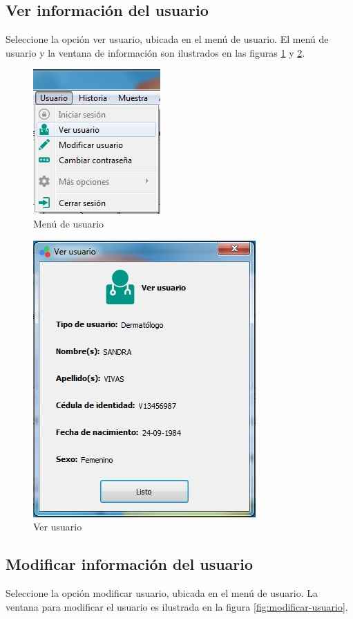 	\subsection*{Ver informaci\'{o}n del usuario}
	
	Seleccione la opci\'{o}n ver usuario, ubicada en el men\'{u} de usuario. El men\'{u} de usuario y la ventana de informaci\'{o}n son ilustrados en las figuras \ref{fig:menu-usuario} y \ref{fig:ver-usuario}.
\newpage
\null
\vfill
\begin{figure}[H]
  \centering
  \includegraphics[width=.3\linewidth]{./img/menu-usuario.jpg}
\caption[]{Men\'{u} de usuario\label{fig:menu-usuario}}
\end{figure}

\begin{figure}[H]
  \centering
  \includegraphics[width=.5\linewidth]{./img/ver-usuario.jpg}
\caption[]{Ver usuario\label{fig:ver-usuario}}
\end{figure}
\vfill
\newpage

	\subsection*{Modificar informaci\'{o}n del usuario}

	Seleccione la opci\'{o}n modificar usuario, ubicada en el men\'{u} de usuario. La ventana para modificar el usuario es ilustrada en la figura \ref{fig:modificar-usuario}.

